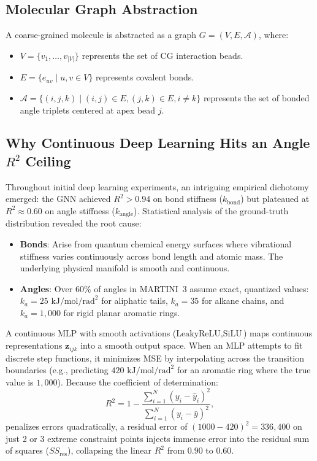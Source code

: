 \documentclass[10pt,journal,compsoc]{IEEEtran}
\begin{document}
\subsection{Molecular Graph Abstraction}
A coarse-grained molecule is abstracted as a graph $G = (V, E, \mathcal{A})$, where:
\begin{itemize}
    \item $V = \{v_1, \dots, v_{|V|}\}$ represents the set of CG interaction beads.
    \item $E = \{e_{uv} \mid u, v \in V\}$ represents covalent bonds.
    \item $\mathcal{A} = \{(i, j, k) \mid (i, j) \in E, (j, k) \in E, i \ne k\}$ represents the set of bonded angle triplets centered at apex bead $j$.
\end{itemize}

\subsection{Why Continuous Deep Learning Hits an Angle $R^2$ Ceiling}
Throughout initial deep learning experiments, an intriguing empirical dichotomy emerged: the GNN achieved $R^2 > 0.94$ on bond stiffness ($k_{\text{bond}}$) but plateaued at $R^2 \approx 0.60$ on angle stiffness ($k_{\text{angle}}$). Statistical analysis of the ground-truth distribution revealed the root cause:
\begin{itemize}
    \item \textbf{Bonds}: Arise from quantum chemical energy surfaces where vibrational stiffness varies continuously across bond length and atomic mass. The underlying physical manifold is smooth and continuous.
    \item \textbf{Angles}: Over $60\%$ of angles in MARTINI~3 assume exact, quantized values: $k_a = 25\text{ kJ/mol/rad}^2$ for aliphatic tails, $k_a = 35$ for alkane chains, and $k_a = 1{,}000$ for rigid planar aromatic rings.
\end{itemize}

A continuous MLP with smooth activations ($\text{LeakyReLU}, \text{SiLU}$) maps continuous representations $\mathbf{z}_{ijk}$ into a smooth output space. When an MLP attempts to fit discrete step functions, it minimizes MSE by interpolating across the transition boundaries (e.g., predicting $420\text{ kJ/mol/rad}^2$ for an aromatic ring where the true value is $1{,}000$). Because the coefficient of determination:
\begin{equation}
R^2 = 1 - \frac{\sum_{i=1}^N (y_i - \hat{y}_i)^2}{\sum_{i=1}^N (y_i - \bar{y})^2},
\end{equation}
penalizes errors quadratically, a residual error of $(1000 - 420)^2 = 336{,}400$ on just 2 or 3 extreme constraint points injects immense error into the residual sum of squares ($SS_{\text{res}}$), collapsing the linear $R^2$ from $0.90$ to $0.60$.
\end{document}
